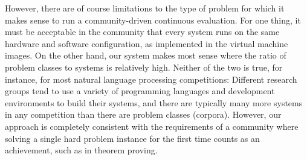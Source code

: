 However, there are of course limitations to the type of problem for
which it makes sense to run a community-driven continuous evaluation.
For one thing, it must be acceptable in the community that every
system runs on the same hardware and software configuration, as
implemented in the virtual machine images.  On the other hand, our
system makes most sense where the ratio of problem classes to systems
is relatively high.  Neither of the two is true, for instance, for
most natural language processing competitions: Different research
groups tend to use a variety of programming languages and development
environments to build their systems, and there are typically many more
systems in any competition than there are problem classes (corpora).
However, our approach is completely consistent with the requirements
of a community where solving a single hard problem instance for the
first time counts as an achievement, such as in theorem proving.




